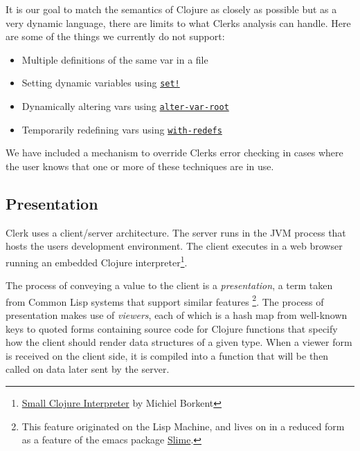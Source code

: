 \documentclass[sigconf,screen]{acmart}
\newcommand{\passthrough}[1]{#1}
\providecommand{\tightlist}{%
  \setlength{\itemsep}{0pt}\setlength{\parskip}{0pt}}
\begin{document}
It is our goal to match the semantics of Clojure as closely as possible but as a very dynamic language, there are limits to what Clerk\textquotesingle s analysis can handle. Here are some of the things we currently do not support:

\begin{itemize}
\tightlist
\item
  Multiple definitions of the same var in a file
\item
  Setting dynamic variables using \href{https://clojuredocs.org/clojure.core/set!}{\passthrough{\lstinline"set!"}}
\item
  Dynamically altering vars using \href{https://clojuredocs.org/clojure.core/alter-var-root}{\passthrough{\lstinline!alter-var-root!}}
\item
  Temporarily redefining vars using \href{https://clojuredocs.org/clojure.core/with-redefs}{\passthrough{\lstinline!with-redefs!}}
\end{itemize}

We have included a mechanism to override Clerk\textquotesingle s error checking in cases where the user knows that one or more of these techniques are in use.

\hypertarget{presentation}{%
\subsection{Presentation}\label{presentation}}

Clerk uses a client/server architecture. The server runs in the JVM process that hosts the user\textquotesingle s development environment. The client executes in a web browser running an embedded Clojure interpreter\footnote{\href{https://github.com/babashka/sci}{Small Clojure Interpreter} by Michiel Borkent}.

The process of conveying a value to the client is a \emph{presentation}, a
term taken from Common Lisp systems that support similar features \footnote{This feature originated on the Lisp Machine, and lives on in a reduced form as a feature of the emacs package \href{https://slime.common-lisp.dev/doc/html/Presentations.html}{Slime}.}. The process of presentation makes use of \emph{viewers}, each of which is a hash map from well-known keys to quoted forms containing source code for Clojure functions that specify how the client should render data structures of a given type. When a viewer form is received on the client side, it is compiled into a function that will be then called on data later sent by the server.
\end{document}
